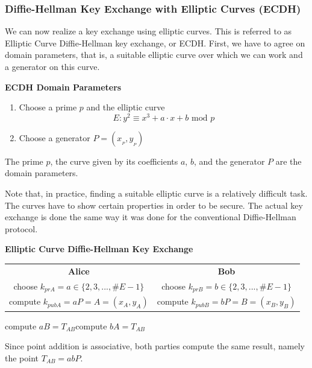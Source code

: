 \documentclass[11pt, a4paper]{article}
\newcommand{\mymod}{
    \text{ mod }
}
\begin{document}
\subsubsection{Diffie-Hellman Key Exchange with Elliptic Curves (ECDH)}
We can now realize a key exchange using elliptic curves. This is referred to as Elliptic Curve Diffie-Hellman key exchange, or ECDH. First, we have to agree on domain parameters, that is, a suitable elliptic curve over which we can work and a generator on this curve.
\begin{framed}
    \hfill\break\textbf{ECDH Domain Parameters}
    \begin{enumerate}
        \item Choose a prime $p$ and the elliptic curve
        $$E:y^2\equiv x^3+a\cdot x+b\mymod p$$
        \item Choose a generator $P=(x_{_P},y_{_P})$
    \end{enumerate}
    The prime $p$, the curve given by its coefficients $a$, $b$, and the generator $P$ are the domain parameters.
\end{framed}
Note that, in practice, finding a suitable elliptic curve is a relatively difficult task. The curves have to show certain properties in order to be secure. The actual key exchange is done the same way it was done for the conventional Diffie-Hellman protocol.
\begin{framed}
    \hfill\break\textbf{Elliptic Curve Diffie-Hellman Key Exchange}
    \begin{center}
        \begin{tabular}{c@{\hskip 3cm}c}
            \textbf{Alice}&\textbf{Bob}\\
            choose $k_{prA}=a\in\{2,3,...,\#E-1\}$&choose $k_{prB}=b\in\{2,3,...,\#E-1\}$\\
            compute $k_{pubA}=aP=A=(x_A,y_A)$&compute $k_{pubB}=bP=B=(x_B,y_B)$
        \end{tabular}
    \end{center}
    \hspace{2.5cm}compute $aB=T_{AB}$\hspace{5.875cm}compute $bA=T_{AB}$
\end{framed}\hfill\break
Since point addition is associative, both parties compute the same result, namely the point $T_{AB}=abP$.\\
\end{document}
